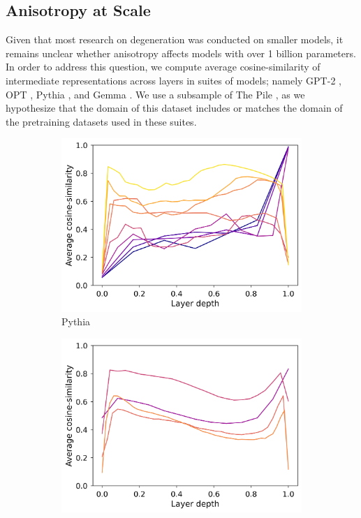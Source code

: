 \subsection{Anisotropy at Scale}
Given that most research on degeneration was conducted on smaller models, it remains unclear whether anisotropy affects models with over 1 billion parameters. In order to address this question, we compute average cosine-similarity of intermediate representations across layers in suites of models; namely GPT-2 \citep{gpt2}, OPT \citep{zhang2022opt}, Pythia \citep{biderman2023pythia}, and Gemma \citep{gemmateam2024gemma}. We use a subsample of The Pile \citep{gao2020pile}, as we hypothesize that the domain of this dataset includes or matches the domain of the pretraining datasets used in these suites.

\begin{figure}[ht]
    \centering
    \begin{subfigure}{0.45\columnwidth}
         \includegraphics[width=\linewidth]{sources/part_1/softmax_bottleneck/imgs/pythia_anisotropy.png}
         \caption{Pythia}
         \label{fig:pythia_aniso}
    \end{subfigure}
    \begin{subfigure}{0.45\columnwidth}
         \includegraphics[width=\linewidth]{sources/part_1/softmax_bottleneck/imgs/gpt2_anisotropy.png}

\end{subfigure}
\end{figure}
